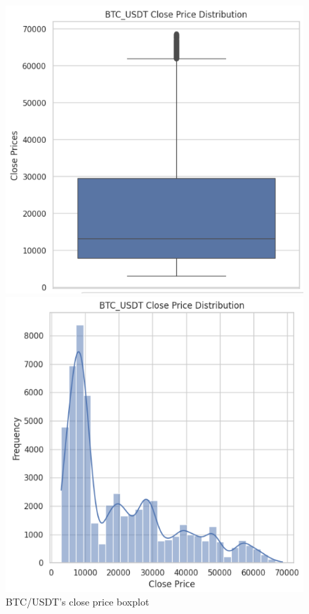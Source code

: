 \documentclass{ieeeojies}
\begin{document}
\begin{figure}[H]
    \centering
    \begin{minipage}{0.23\textwidth}
    \centering
    \includegraphics[width=1\textwidth]{bibliography/BTC_box.png}
    \caption{BTC/USDT's close price boxplot}
    \label{fig:enter-label}
    \end{minipage}
    \hfill
    \begin{minipage}{0.23\textwidth}
    \centering
    \includegraphics[width=1\textwidth]{bibliography/BTC_hist.png}

\end{minipage}
\end{figure}
\end{document}
